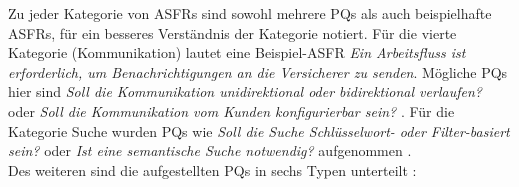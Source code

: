 Zu jeder Kategorie von ASFRs sind sowohl mehrere PQs als auch beispielhafte ASFRs, f\"ur ein besseres Verst\"andnis der Kategorie notiert. F\"ur die vierte Kategorie (Kommunikation) lautet eine Beispiel-ASFR \textit{Ein Arbeitsfluss ist erforderlich, um Benachrichtigungen an die Versicherer zu senden}. M\"ogliche PQs hier sind \textit{Soll die Kommunikation unidirektional oder bidirektional verlaufen?} oder \textit{Soll die Kommunikation vom Kunden konfigurierbar sein?} \cite{Ros03}. F\"ur die Kategorie Suche wurden PQs wie \textit{Soll die Suche Schl\"usselwort- oder Filter-basiert sein?} oder \textit{Ist eine semantische Suche notwendig?} aufgenommen \cite{Ros03}. \\

Des weiteren sind die aufgestellten PQs in sechs Typen unterteilt \cite{Ros02}: \\

